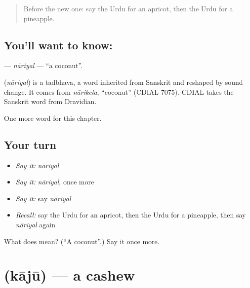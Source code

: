 \label{lesson:UR-C252-nariyal}



\begin{quote}
Before the new one: say the Urdu for an apricot, then the Urdu for a pineapple.
\end{quote}

\subsection*{You'll want to know: }
\textbf{} — \emph{nāriyal} — \textquotedblleft{}a coconut\textquotedblright{}.

\begin{cousinweb}
\textbf{} (\emph{nāriyal}) is a tadbhava, a word inherited from Sanskrit and reshaped by sound change. It comes from \emph{nārikela}, \textquotedblleft{}coconut\textquotedblright{} (CDIAL 7075). CDIAL takes the Sanskrit word from Dravidian.
\end{cousinweb}

\begin{grammarlens}[title={What you've built}]
One more word for this chapter.
\end{grammarlens}

\subsection*{Your turn}
\begin{itemize}
\raggedright
  \item \emph{Say it:} \emph{nāriyal}
  \item \emph{Say it:} \emph{nāriyal}, once more
  \item \emph{Say it:} say \emph{nāriyal}
  \item \emph{Recall:} say the Urdu for an apricot, then the Urdu for a pineapple, then say \emph{nāriyal} again
\end{itemize}

\begin{tcolorbox}[breakable,colback=teal!4,colframe=teal!35!black,title={Before you move on}]
What does  mean? (\textquotedblleft{}A coconut\textquotedblright{}.) Say it once more.
\end{tcolorbox}
\section[\texorpdfstring{\ur{کاجو} (kājū)}{کاجو (kājū)}]{ (kājū) — a cashew}


